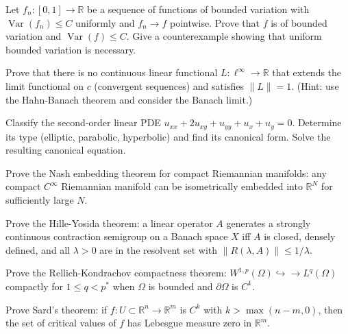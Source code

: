 \documentclass[12pt,a4paper]{exam}
\begin{document}
\begin{questions}

\question[4]
Let $f_n: [0,1] \to \mathbb{R}$ be a sequence of functions of bounded variation with $\operatorname{Var}(f_n) \leq C$ uniformly and $f_n \to f$ pointwise. Prove that $f$ is of bounded variation and $\operatorname{Var}(f) \leq C$. Give a counterexample showing that uniform bounded variation is necessary.

\vspace{0.3cm}

\question[2]
Prove that there is no continuous linear functional $L: \ell^\infty \to \mathbb{R}$ that extends the limit functional on $c$ (convergent sequences) and satisfies $\|L\| = 1$. (Hint: use the Hahn-Banach theorem and consider the Banach limit.)

\vspace{0.3cm}

\question[5]
Classify the second-order linear PDE $u_{xx} + 2u_{xy} + u_{yy} + u_x + u_y = 0$. Determine its type (elliptic, parabolic, hyperbolic) and find its canonical form. Solve the resulting canonical equation.

\vspace{0.3cm}

\question[6]
Prove the Nash embedding theorem for compact Riemannian manifolds: any compact $C^\infty$ Riemannian manifold can be isometrically embedded into $\mathbb{R}^N$ for sufficiently large $N$.

\vspace{0.3cm}

\question[5]
Prove the Hille-Yosida theorem: a linear operator $A$ generates a strongly continuous contraction semigroup on a Banach space $X$ iff $A$ is closed, densely defined, and all $\lambda > 0$ are in the resolvent set with $\|R(\lambda,A)\| \leq 1/\lambda$.

\vspace{0.3cm}

\question[2]
Prove the Rellich-Kondrachov compactness theorem: $W^{1,p}(\Omega) \hookrightarrow\!\!\!\to L^q(\Omega)$ compactly for $1 \leq q < p^*$ when $\Omega$ is bounded and $\partial\Omega$ is $C^1$.

\vspace{0.3cm}

\question[4]
Prove Sard's theorem: if $f: U \subset \mathbb{R}^n \to \mathbb{R}^m$ is $C^k$ with $k > \max(n-m, 0)$, then the set of critical values of $f$ has Lebesgue measure zero in $\mathbb{R}^m$.


\end{questions}
\end{document}
